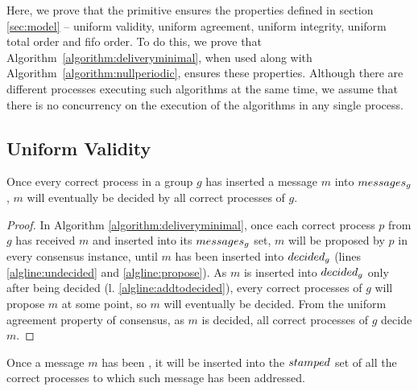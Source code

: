 \documentclass[times, 10pt]{article}
\begin{document}
Here, we prove that the \amcast{} primitive ensures the properties defined in section \ref{sec:model} -- uniform validity, uniform agreement, uniform integrity, uniform total order and fifo order. To do this, we prove that \mbox{Algorithm \ref{algorithm:deliveryminimal}}, when used along with \mbox{Algorithm \ref{algorithm:nullperiodic}}, ensures these properties. Although there are different processes executing such algorithms at the same time, we assume that there is no concurrency on the execution of the algorithms in any single process.





\subsection{Uniform Validity}




\begin{lems} \label{lemma:mcastdecided}
Once every correct process in a group $g$ has inserted a message $m$ into $messages\text{$_g$}$, $m$ will eventually be decided by all correct processes of $g$.
\end{lems}

\begin{proof}
In Algorithm \ref{algorithm:deliveryminimal}, once each correct process $p$ from $g$ has received $m$ and inserted into its $messages\text{$_g$}$ set, $m$ will be proposed by $p$ in every consensus instance, until $m$ has been inserted into $decided\text{$_g$}$ (lines \ref{algline:undecided} and \ref{algline:propose}). As $m$ is inserted into $decided\text{$_g$}$ only after being decided (l. \ref{algline:addtodecided}), every correct processes of $g$ will propose $m$ at some point, so $m$ will eventually be decided. From the uniform agreement property of consensus, as $m$ is decided, all correct processes of $g$ decide $m$.
\end{proof}







\begin{lems} \label{lemma:mcastbarpending}
Once a message $m$ has been \amcast{}, it will be inserted into the $stamped$ set of all the correct processes to which such message has been addressed.
\end{lems}
\end{document}
